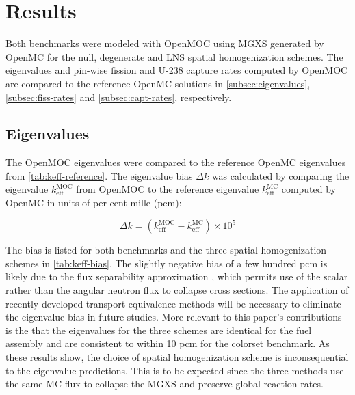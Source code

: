 \section{Results}
\label{sec:results}

Both benchmarks were modeled with OpenMOC using MGXS generated by OpenMC for the null, degenerate and LNS spatial homogenization schemes. The eigenvalues and pin-wise fission and U-238 capture rates computed by OpenMOC are compared to the reference OpenMC solutions in \autoref{subsec:eigenvalues}, \autoref{subsec:fiss-rates} and \autoref{subsec:capt-rates}, respectively.


\subsection{Eigenvalues}
\label{subsec:eigenvalues}

The OpenMOC eigenvalues were compared to the reference OpenMC eigenvalues from \autoref{tab:keff-reference}. The eigenvalue bias $\Delta k$ was calculated by comparing the eigenvalue $k_{\textrm{eff}}^{\textrm{MOC}}$ from OpenMOC to the reference eigenvalue $k_{\textrm{eff}}^{\textrm{MC}}$ computed by OpenMC in units of per cent mille (pcm):

\begin{equation}
\label{eqn:delta-rho}
\Delta k = \left(k_{\textrm{eff}}^{\textrm{MOC}} - k_{\textrm{eff}}^{\textrm{MC}}\right) \times 10^{5}
\end{equation}

The bias is listed for both benchmarks and the three spatial homogenization schemes in \autoref{tab:keff-bias}. The slightly negative bias of a few hundred pcm is likely due to the flux separability approximation \citep{boyd2018sph}, which permits use of the scalar rather than the angular neutron flux to collapse cross sections. The application of recently developed transport equivalence methods \citep{giudicelli2018} will be necessary to eliminate the eigenvalue bias in future studies. More relevant to this paper's contributions is the that the eigenvalues for the three schemes are identical for the fuel assembly and are consistent to within 10 pcm for the colorset benchmark. As these results show, the choice of spatial homogenization scheme is inconsequential to the eigenvalue predictions. This is to be expected since the three methods use the same MC flux to collapse the MGXS and preserve global reaction rates.

